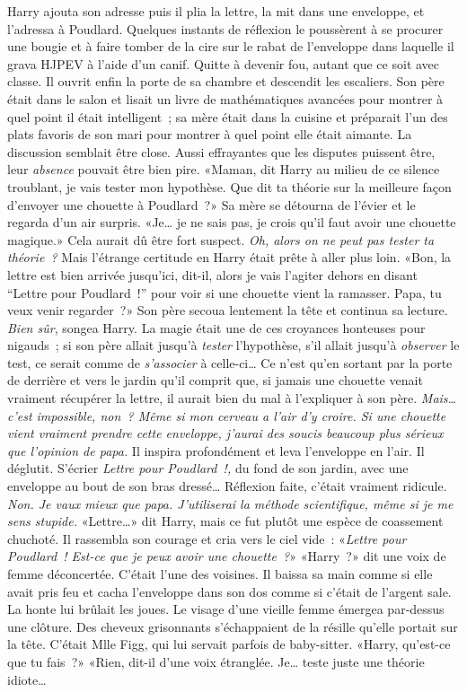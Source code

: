 Harry ajouta son adresse puis il plia la lettre, la mit dans une enveloppe, et l'adressa à Poudlard. Quelques instants de réflexion le poussèrent à se procurer une bougie et à faire tomber de la cire sur le rabat de l'enveloppe dans laquelle il grava HJPEV à l'aide d'un canif. Quitte à devenir fou, autant que ce soit avec classe.
Il ouvrit enfin la porte de sa chambre et descendit les escaliers. Son père était dans le salon et lisait un livre de mathématiques avancées pour montrer à quel point il était intelligent~; sa mère était dans la cuisine et préparait l'un des plats favoris de son mari pour montrer à quel point elle était aimante. La discussion semblait être close. Aussi effrayantes que les disputes puissent être, leur \emph{absence} pouvait être bien pire.
«Maman, dit Harry au milieu de ce silence troublant, je vais tester mon hypothèse. Que dit ta théorie sur la meilleure façon d'envoyer une chouette à Poudlard~?»
Sa mère se détourna de l'évier et le regarda d'un air surpris. «Je… je ne sais pas, je crois qu'il faut avoir une chouette magique.»
Cela aurait dû être fort suspect. \emph{Oh, alors on ne peut pas tester ta théorie~?} Mais l'étrange certitude en Harry était prête à aller plus loin.
«Bon, la lettre est bien arrivée jusqu'ici, dit-il, alors je vais l'agiter dehors en disant “Lettre pour Poudlard~!” pour voir si une chouette vient la ramasser. Papa, tu veux venir regarder~?»
Son père secoua lentement la tête et continua sa lecture. \emph{Bien sûr}, songea Harry. La magie était une de ces croyances honteuses pour nigauds~; si son père allait jusqu'à \emph{tester} l'hypothèse, s'il allait jusqu'à \emph{observer} le test, ce serait comme de \emph{s'associer} à celle-ci…
Ce n'est qu'en sortant par la porte de derrière et vers le jardin qu'il comprit que, si jamais une chouette venait vraiment récupérer la lettre, il aurait bien du mal à l'expliquer à son père.
\emph{Mais… c'est impossible, non~? Même si mon cerveau a l'air d'y croire. Si une chouette vient vraiment prendre cette enveloppe, j'aurai des soucis beaucoup plus sérieux que l'opinion de papa.}
Il inspira profondément et leva l'enveloppe en l'air.
Il déglutit.
S'écrier \emph{Lettre pour Poudlard~!,} du fond de son jardin, avec une enveloppe au bout de son bras dressé… Réflexion faite, c'était vraiment ridicule.
\emph{Non. Je vaux mieux que papa. J'utiliserai la méthode scientifique, même si je me sens stupide.}
«Lettre…» dit Harry, mais ce fut plutôt une espèce de coassement chuchoté.
Il rassembla son courage et cria vers le ciel vide~: «\emph{Lettre pour Poudlard~! Est-ce que je peux avoir une chouette~?}»
«Harry~?» dit une voix de femme déconcertée. C'était l'une des voisines.
Il baissa sa main comme si elle avait pris feu et cacha l'enveloppe dans son dos comme si c'était de l'argent sale. La honte lui brûlait les joues.
Le visage d'une vieille femme émergea par-dessus une clôture. Des cheveux grisonnants s'échappaient de la résille qu'elle portait sur la tête. C'était Mlle Figg, qui lui servait parfois de baby-sitter. «Harry, qu'est-ce que tu fais~?»
«Rien, dit-il d'une voix étranglée. Je… teste juste une théorie idiote…

